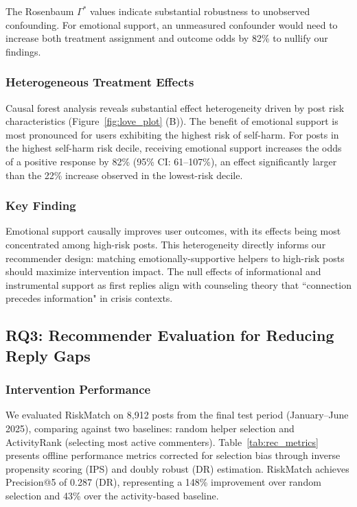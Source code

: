 \documentclass[letterpaper]{article} %
\begin{document}
The Rosenbaum $\Gamma^*$ values indicate substantial robustness to unobserved confounding. For emotional support, an unmeasured confounder would need to increase both treatment assignment and outcome odds by 82\% to nullify our findings. 


\subsubsection{Heterogeneous Treatment Effects}

Causal forest analysis reveals substantial effect heterogeneity driven by post risk characteristics (Figure~\ref{fig:love_plot} (B)). The benefit of emotional support is most pronounced for users exhibiting the highest risk of self-harm. For posts in the highest self-harm risk decile, receiving emotional support increases the odds of a positive response by 82\% (95\% CI: 61–107\%), an effect significantly larger than the 22\% increase observed in the lowest-risk decile.

\subsubsection{Key Finding} 
Emotional support causally improves user outcomes, with its effects being most concentrated among high-risk posts. This heterogeneity directly informs our recommender design: matching emotionally-supportive helpers to high-risk posts should maximize intervention impact. The null effects of informational and instrumental support as first replies align with counseling theory that ``connection precedes information" in crisis contexts.

\subsection{RQ3: Recommender Evaluation for Reducing Reply Gaps}

\subsubsection{Intervention Performance}

We evaluated RiskMatch on 8,912 posts from the final test period (January–June 2025), comparing against two baselines: random helper selection and ActivityRank (selecting most active commenters). Table~\ref{tab:rec_metrics} presents offline performance metrics corrected for selection bias through inverse propensity scoring (IPS) and doubly robust (DR) estimation. RiskMatch achieves Precision@5 of 0.287 (DR), representing a 148\% improvement over random selection and 43\% over the activity-based baseline.
\end{document}
